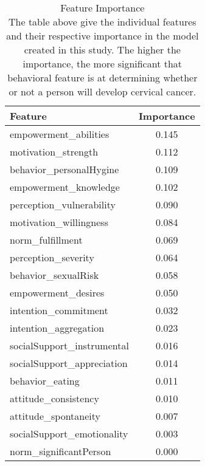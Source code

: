 \documentclass[10pt, oneside, twocolumn]{article}
\begin{document}
\begin{table}[]
\begin{tabular}{|l|c|}
\hline
\textbf{Feature}            & \multicolumn{1}{l|}{\textbf{Importance}} \\ \hline
empowerment\_abilities      & 0.145                           \\ \hline
motivation\_strength        & 0.112                           \\ \hline
behavior\_personalHygine    & 0.109                           \\ \hline
empowerment\_knowledge      & 0.102                           \\ \hline
perception\_vulnerability   & 0.090                           \\ \hline
motivation\_willingness     & 0.084                           \\ \hline
norm\_fulfillment           & 0.069                           \\ \hline
perception\_severity        & 0.064                           \\ \hline
behavior\_sexualRisk        & 0.058                           \\ \hline
empowerment\_desires        & 0.050                           \\ \hline
intention\_commitment       & 0.032                           \\ \hline
intention\_aggregation      & 0.023                           \\ \hline
socialSupport\_instrumental & 0.016                           \\ \hline
socialSupport\_appreciation & 0.014                           \\ \hline
behavior\_eating            & 0.011                           \\ \hline
attitude\_consistency       & 0.010                           \\ \hline
attitude\_spontaneity       & 0.007                           \\ \hline
socialSupport\_emotionality & 0.003                           \\ \hline
norm\_significantPerson     & 0.000                           \\ \hline
\end{tabular}
\caption{Feature Importance \\The table above give the individual features and their respective importance in the model created in this study. The higher the importance, the more significant that behavioral feature is at determining whether or not a person will develop cervical cancer.}
\end{table}
\end{document}
